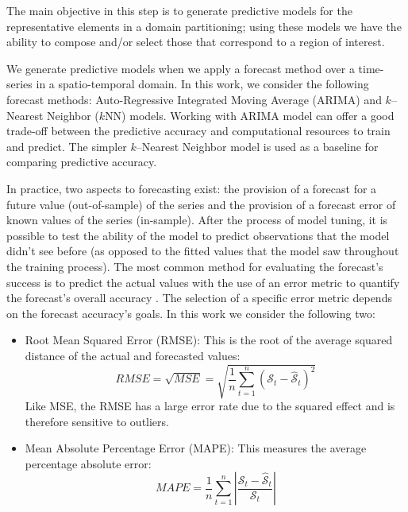 The main objective in this step is to generate predictive models for the representative elements in a domain partitioning; using these models we have the ability to compose and/or select those that correspond to a region of interest. 

We generate predictive models when we apply a forecast method over a time-series in a spatio-temporal domain. In this work, we consider the following forecast methods: Auto-Regressive Integrated Moving Average (ARIMA) and $k$--Nearest Neighbor ($k$NN) models. Working with ARIMA model can offer a good trade-off between the predictive accuracy and computational resources to train and predict. The simpler $k$--Nearest Neighbor model is used as a baseline for comparing predictive accuracy.   

In practice, two aspects to forecasting exist: the provision of a forecast for a future value (out-of-sample) of the series and the provision of a forecast error of known values of the series (in-sample). After the process of model tuning, it is possible to test the ability of the model to predict observations that the model didn't see before (as opposed to the fitted values that the model saw throughout the training process). %
The most common method for evaluating the forecast's success is to predict the actual values with the use of an error metric to quantify the forecast's overall accuracy \cite{Hyndman2006}. The selection of a specific error metric depends on the forecast accuracy's goals. In this work we consider the following two:

\begin{itemize}
	\item Root Mean Squared Error (RMSE): This is the root of the average squared distance of the actual and forecasted values:
	\begin{equation}
	RMSE = \sqrt{MSE} = \sqrt{\frac{1}{n} \sum_{t=1}^{n} \left(\mathcal{S}_{t} - \mathcal{\hat{S}}_t\right)^{2}}
	\end{equation}
	Like MSE, the RMSE has a large error rate due to the squared effect and is therefore sensitive to outliers.
	\item Mean Absolute Percentage Error (MAPE): This measures the average percentage
	absolute error:
	\begin{equation}
	MAPE = \frac{1}{n} \sum_{t=1}^{n} \left|\frac{\mathcal{S}_{t} - \mathcal{\hat{S}}_{t}}{\mathcal{S}_{t}}\right|
	\end{equation}
\end{itemize}


